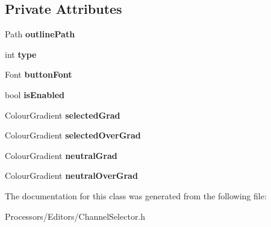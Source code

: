 \subsection*{Private Attributes}
\begin{DoxyCompactItemize}
\item 
\hypertarget{classEditorButton_a0aa12206f7c62b11345765bb13f6c79a}{Path {\bfseries outline\-Path}}\label{classEditorButton_a0aa12206f7c62b11345765bb13f6c79a}

\item 
\hypertarget{classEditorButton_ab304ddf5eae1493122cbff94c1f1ef38}{int {\bfseries type}}\label{classEditorButton_ab304ddf5eae1493122cbff94c1f1ef38}

\item 
\hypertarget{classEditorButton_a17ede639862a8ba98c2f9b5db2a4c315}{Font {\bfseries button\-Font}}\label{classEditorButton_a17ede639862a8ba98c2f9b5db2a4c315}

\item 
\hypertarget{classEditorButton_a48df6c37c0b8b56340b6488e487f43db}{bool {\bfseries is\-Enabled}}\label{classEditorButton_a48df6c37c0b8b56340b6488e487f43db}

\item 
\hypertarget{classEditorButton_a18ab69b4c86f0bb5e4b87f41964503e3}{Colour\-Gradient {\bfseries selected\-Grad}}\label{classEditorButton_a18ab69b4c86f0bb5e4b87f41964503e3}

\item 
\hypertarget{classEditorButton_afc3411c019d5befd3ca2fb694e16ccf8}{Colour\-Gradient {\bfseries selected\-Over\-Grad}}\label{classEditorButton_afc3411c019d5befd3ca2fb694e16ccf8}

\item 
\hypertarget{classEditorButton_a152e8a9731e6860395fc8c0b7bcd60af}{Colour\-Gradient {\bfseries neutral\-Grad}}\label{classEditorButton_a152e8a9731e6860395fc8c0b7bcd60af}

\item 
\hypertarget{classEditorButton_a1090cad0c5a5794618240b0756857025}{Colour\-Gradient {\bfseries neutral\-Over\-Grad}}\label{classEditorButton_a1090cad0c5a5794618240b0756857025}

\end{DoxyCompactItemize}


The documentation for this class was generated from the following file\-:\begin{DoxyCompactItemize}
\item 
Processors/\-Editors/Channel\-Selector.\-h\end{DoxyCompactItemize}
